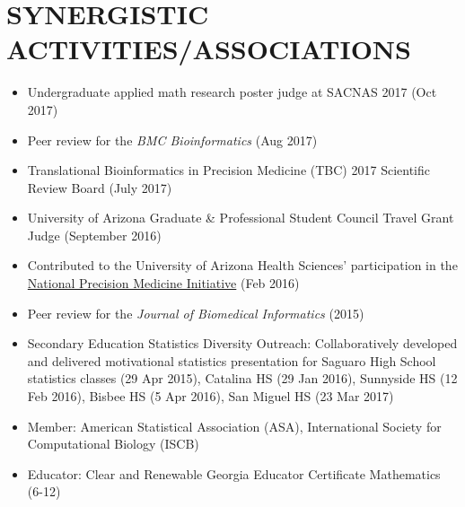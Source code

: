 \documentclass[paper=a4,fontsize=11pt]{scrartcl} %
\newcommand{\NewPart}[2]{\section*{\uppercase{#1} #2 }}
\begin{document}
\NewPart{Synergistic Activities/Associations}{}
\vspace{-7pt}
\begin{itemize}[noitemsep]
\item Undergraduate applied math research poster judge at SACNAS 2017 (Oct 2017)
\item Peer review for the \emph{BMC Bioinformatics} (Aug 2017)
\item Translational Bioinformatics in Precision Medicine (TBC) 2017 Scientific Review Board (July 2017)
\item University of Arizona Graduate \& Professional Student Council Travel Grant Judge (September 2016)
\item Contributed to the University of Arizona Health Sciences' participation in the   \href{https://www.nih.gov/precision-medicine-initiative-cohort-program}{National Precision Medicine Initiative\circledR}  \hspace{3pt}(Feb 2016)
  \item Peer review for the \emph{Journal of Biomedical Informatics} (2015)
\item Secondary Education Statistics Diversity Outreach: Collaboratively developed and delivered motivational statistics presentation for Saguaro High School statistics classes (29 Apr 2015), Catalina HS (29 Jan 2016), Sunnyside HS (12 Feb 2016), Bisbee HS (5 Apr 2016), San Miguel HS (23 Mar 2017)
\item Member: American Statistical Association (ASA), International Society for Computational Biology (ISCB)
\item Educator: Clear and Renewable Georgia Educator Certificate Mathematics (6-12)
\vspace{-7pt}
\end{itemize}

\end{document}

